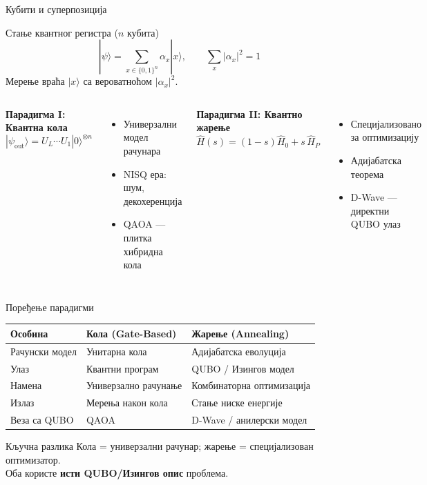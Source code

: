 \documentclass[aspectratio=169]{beamer}
\begin{document}
\begin{frame}{Кубити и суперпозиција}
  \begin{block}{Стање квантног регистра ($n$ кубита)}
    \[
      |\psi\rangle = \sum_{x \in \{0,1\}^n} \alpha_x |x\rangle,
      \qquad \sum_x |\alpha_x|^2 = 1
    \]
    Мерење враћа $|x\rangle$ са вероватноћом $|\alpha_x|^2$.
  \end{block}

  \bigskip
  \begin{columns}[T]
      \textbf{Парадигма I: Квантна кола}
      \[
        |\psi_{\text{out}}\rangle = U_L \cdots U_1 |0\rangle^{\otimes n}
      \]
      \begin{itemize}\small
        \item Универзални модел рачунара
        \item NISQ ера: шум, декохеренција
        \item QAOA — плитка хибридна кола
      \end{itemize}
      \textbf{Парадигма II: Квантно жарење}
      \[
        \hat{H}(s) = (1-s)\hat{H}_0 + s\,\hat{H}_P
      \]
      \begin{itemize}\small
        \item Специјализовано за оптимизацију
        \item Адијабатска теорема
        \item D-Wave — директни QUBO улаз
      \end{itemize}
  \end{columns}
\end{frame}

\begin{frame}{Поређење парадигми}
  \begin{table}
    \renewcommand{\arraystretch}{1.4}
    \begin{tabular}{lll}
      \toprule
      \textbf{Особина} & \textbf{Кола (Gate-Based)} & \textbf{Жарење (Annealing)} \\
      \midrule
      Рачунски модел   & Унитарна кола              & Адијабатска еволуција \\
      Улаз             & Квантни програм            & QUBO / Изингов модел \\
      Намена           & Универзално рачунање       & Комбинаторна оптимизација \\
      Излаз            & Мерења након кола          & Стање ниске енергије \\
      Веза са QUBO     & QAOA                       & D-Wave / анилерски модел \\
      \bottomrule
    \end{tabular}
  \end{table}

  \bigskip
  \begin{block}{Кључна разлика}
    Кола = универзални рачунар; жарење = специјализован оптимизатор.\\
    Оба користе \textbf{исти QUBO/Изингов опис} проблема.
  \end{block}
\end{frame}
\end{document}
